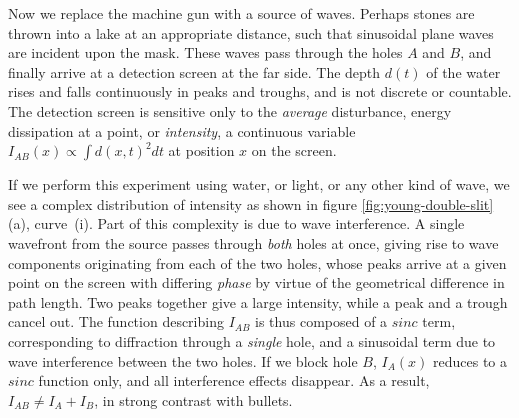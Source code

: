 Now we replace the machine gun with a source of waves. Perhaps stones are thrown into a lake at an appropriate distance, such that sinusoidal plane waves are incident upon the mask. 
These waves pass through the holes $A$ and $B$, and finally arrive at a detection screen at the far side. The depth $d(t)$ of the water rises and falls continuously in peaks and troughs, and is not discrete or countable.  The detection screen is sensitive only to the \emph{average} disturbance, energy dissipation at a point, or \emph{intensity}, a continuous variable $I_{AB}(x) \propto \int d(x, t)^2 dt$ at position $x$ on the screen. 

If we perform this experiment using water, or light, or any other kind of wave, we see a complex distribution of intensity as shown in figure \ref{fig:young-double-slit}(a), curve~(i). Part of this complexity is due to wave interference. A single wavefront from the source passes through \emph{both} holes at once, giving rise to wave components originating from each of the two holes, whose peaks arrive at a given point on the screen with differing \emph{phase} by virtue of the geometrical difference in path length. Two peaks together give a large intensity, while a peak and a trough cancel out. The function describing $I_{AB}$ is thus composed of a $sinc$ term, corresponding to diffraction through a \emph{single} hole, and a sinusoidal term due to wave interference between the two holes.  If we block hole $B$, $I_{A}(x)$ reduces to a $sinc$ function only, and all interference effects disappear. As a result, $I_{AB}\ne I_{A}+I_{B}$, in strong contrast with bullets. 

